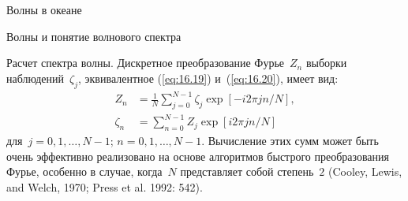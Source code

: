 \begin{chapter}{Волны в океане}
\begin{section}{Волны и понятие волнового спектра}
\begin{paragraph}{Расчет спектра волны.}
Дискретное преобразование Фурье~$Z_n$
выборки наблюдений~$\zeta_j$, эквивалентное (\ref{eq:16.19}) 
и~(\ref{eq:16.20}), имеет вид:
\begin{subequations}
\begin{align}
    Z_{n} &= \frac{1}{N} \sum_{j=0}^{N-1} \zeta_{j} \exp [-i2 \pi j n /N], \\
\zeta_{n} &= \sum_{n=0}^{N-1} Z_{j} \exp [i 2 \pi j n /N]
\end{align}
\end{subequations}
для~$j=0,1,\ldots, N-1$; $n= 0, 1, \ldots, N-1$. Вычисление этих сумм
может быть очень эффективно реализовано на основе алгоритмов быстрого
преобразования Фурье, особенно в случае, когда~$N$ представляет собой 
степень~$2$ (Cooley, Lewis, and Welch, 1970; Press et al. 1992: 542).
%


\end{paragraph}
\end{section}
\end{chapter}
